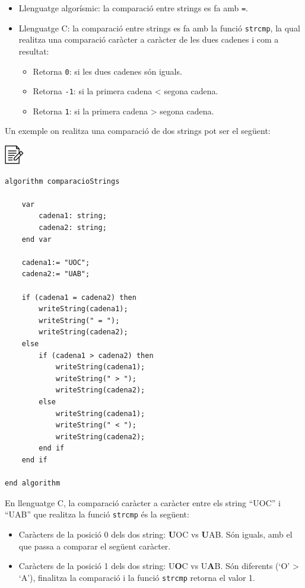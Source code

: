 \documentclass[]{book}
\providecommand{\tightlist}{%
  \setlength{\itemsep}{0pt}\setlength{\parskip}{0pt}}
\begin{document}
\begin{itemize}
\tightlist
\item
  Llenguatge algorísmic: la comparació entre strings es fa amb
  \texttt{=}.
\item
  Llenguatge C: la comparació entre strings es fa amb la funció
  \texttt{strcmp}, la qual realitza una comparació caràcter a caràcter
  de les dues cadenes i com a resultat:

  \begin{itemize}
  \tightlist
  \item
    Retorna \texttt{0}: si les dues cadenes són iguals.
  \item
    Retorna \texttt{-1}: si la primera cadena \textless{} segona cadena.
  \item
    Retorna \texttt{1}: si la primera cadena \textgreater{} segona
    cadena.
  \end{itemize}
\end{itemize}

Un exemple on realitza una comparació de dos strings pot ser el següent:

\includegraphics{./img/alg.png}

\begin{verbatim}
algorithm comparacioStrings

    var
        cadena1: string;
        cadena2: string;
    end var

    cadena1:= "UOC";
    cadena2:= "UAB";

    if (cadena1 = cadena2) then
        writeString(cadena1);
        writeString(" = ");
        writeString(cadena2);
    else
        if (cadena1 > cadena2) then
            writeString(cadena1);
            writeString(" > ");
            writeString(cadena2);
        else
            writeString(cadena1);
            writeString(" < ");
            writeString(cadena2);
        end if
    end if

end algorithm
\end{verbatim}

En llenguatge C, la comparació caràcter a caràcter entre els string
``UOC'' i ``UAB'' que realitza la funció \texttt{strcmp} és la següent:

\begin{itemize}
\tightlist
\item
  Caràcters de la posició 0 dels dos string: \textbf{U}OC vs
  \textbf{U}AB. Són iguals, amb el que passa a comparar el següent
  caràcter.
\item
  Caràcters de la posició 1 dels dos string: U\textbf{O}C vs
  U\textbf{A}B. Són diferents (`O' \textgreater{} `A'), finalitza la
  comparació i la funció \texttt{strcmp} retorna el valor 1.
\end{itemize}
\end{document}
